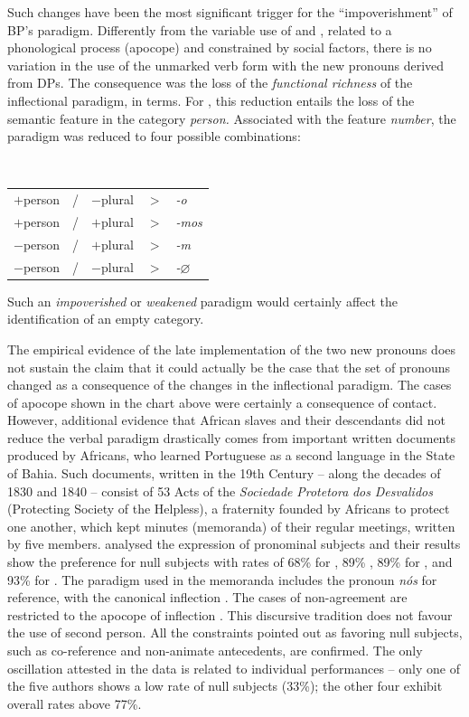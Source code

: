 \documentclass[output=paper]{langsci/langscibook}
\begin{document}
Such changes have been the most significant trigger for the “impoverishment” of
BP’s paradigm. Differently from the variable use of  and , related to a
phonological process (apocope) and constrained by social factors, there is no
variation in the use of the unmarked verb form with the new pronouns derived
from DPs. The consequence was the loss of the \emph{functional richness}
of the inflectional paradigm, in  terms. For
\citet{Galves1993}, this reduction entails the loss of the semantic feature in
the category \emph{person.} Associated with the feature \emph{number}, the
paradigm was reduced to four possible combinations:

\ea%
    \label{ex:key:26.5}\leavevmode\\[-1\baselineskip]%
    \begin{tabular}{lllll}
    $+$person & / & $-$plural & $>$ & \emph{-o} \\
    $+$person & / & $+$plural & $>$ & \emph{-mos} \\
    $-$person & / & $+$plural & $>$ & \emph{-m} \\
    $-$person & / & $-$plural & $>$ & \emph{-}$\varnothing$ \\
    \end{tabular}
\z

Such an \emph{impoverished} or \emph{weakened} paradigm would certainly affect
the identification of an empty category.

The empirical evidence of the late implementation of the two new pronouns does
not sustain the claim that it could actually be the case that the set of
pronouns changed as a consequence of the changes in the inflectional paradigm.
The cases of apocope shown in the chart above were certainly a consequence of
contact. However, additional evidence that African slaves and their descendants
did not reduce the verbal paradigm drastically comes from important written
documents produced by Africans, who learned Portuguese as a second language in
the State of Bahia. Such documents, written in the 19th
Century – along the decades of 1830 and 1840 – consist of 53 Acts of the
\emph{Sociedade} \emph{Protetora} \emph{dos} \emph{Desvalidos} (Protecting
Society of the Helpless), a fraternity founded by Africans to protect one
another, which kept minutes (memoranda) of their regular meetings, written by
five members. \citet{AlmeidaCarneiro2009} analysed the expression of pronominal
subjects and their results show the preference for null subjects with rates of
68\% for \Fsg{}, 89\% \Fpl{}, 89\% for \Tsg{}, and 93\% for \Tpl{}. The
paradigm used in the memoranda includes the pronoun \emph{nós} for \Fpl{}
reference, with the canonical inflection . The cases of non-agreement are
restricted to the apocope of \Tpl{} inflection . This discursive tradition
does not favour the use of second person. All the constraints pointed out as
favoring null subjects, such as co-reference and non-animate antecedents, are
confirmed. The only oscillation attested in the data is related to individual
performances – only one of the five authors shows a low rate of null subjects
(33\%); the other four exhibit overall rates above 77\%.
\end{document}
